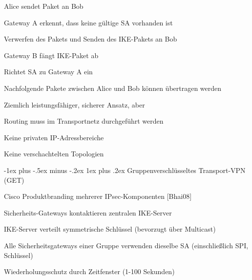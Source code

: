\documentclass[a4paper]{article}
\makeatletter
\renewcommand{\subsubsection}{\@startsection{subsubsection}{3}{0mm}%
 {-1ex plus -.5ex minus -.2ex}%
 {1ex plus .2ex}%
 {\normalfont\small\bfseries}}
\makeatother
\begin{document}
\begin{multicols}{3}
\begin{itemize*}
\begin{itemize*}
                  \begin{itemize*}
                        \item Alice sendet Paket an Bob
                        \item Gateway A erkennt, dass keine gültige SA vorhanden ist
                        \item Verwerfen des Pakets und Senden des IKE-Pakets an Bob
                        \item Gateway B fängt IKE-Paket ab
                        \item Richtet SA zu Gateway A ein
                        \item Nachfolgende Pakete zwischen Alice und Bob können übertragen werden
                  \end{itemize*}
                  \item
                  Ziemlich leistungsfähiger, sicherer Ansatz, aber

                  \begin{itemize*}
                        \item Routing muss im Transportnetz durchgeführt werden
                        \item Keine privaten IP-Adressbereiche
                        \item Keine verschachtelten Topologien
                  \end{itemize*}
            \end{itemize*}


            \subsubsection{Gruppenverschlüsseltes Transport-VPN
                  (GET)}

            \begin{itemize*}
                  \item
                  Cisco Produktbranding mehrerer IPsec-Komponenten {[}Bhai08{]}
                  \item
                  Sicherheits-Gateways kontaktieren zentralen IKE-Server
                  \item
                  IKE-Server verteilt symmetrische Schlüssel (bevorzugt über Multicast)
                  \item
                  Alle Sicherheitsgateways einer Gruppe verwenden dieselbe SA
                  (einschließlich SPI, Schlüssel)
                  \item
                  Wiederholungsschutz durch Zeitfenster (1-100 Sekunden)


\end{itemize*}
\end{itemize*}
\end{multicols}
\end{document}
